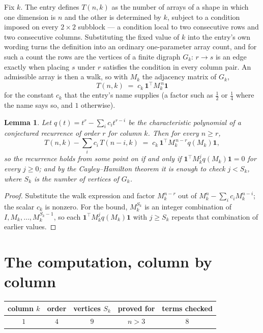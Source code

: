 \documentclass[11pt,a4paper]{article}
\theoremstyle{plain}
\newtheorem{lemma}[theorem]{Lemma}
\theoremstyle{definition}
\begin{document}
Fix $k$. The entry defines $T(n,k)$ as the number of arrays of a shape in which one dimension
is $n$ and the other is determined by $k$, subject to a condition imposed on every
$2\times2$ subblock --- a condition local to two consecutive rows and two consecutive columns.
Substituting the fixed value of $k$ into the entry's own wording turns the definition into an
ordinary one-parameter array count, and for such a count the rows are the vertices of a finite
digraph $G_k$: $r\to s$ is an edge exactly when placing $s$ under $r$ satisfies the condition
in every column pair. An admissible array is then a walk, so with $M_k$ the adjacency matrix
of $G_k$,
\[
T(n,k)\;=\;c_k\,\mathbf{1}^{\!\top}M_k^{\,n}\mathbf{1}
\]
for the constant $c_k$ that the entry's name supplies (a factor such as $\tfrac12$ or
$\tfrac14$ where the name says so, and $1$ otherwise).

\begin{lemma}\label{lem:crit}
Let $q(t)=t^{r}-\sum_i c_it^{r-i}$ be the characteristic polynomial of a conjectured
recurrence of order $r$ for column $k$. Then for every $n\ge r$,
\[
T(n,k)-\sum_i c_i\,T(n-i,k)\;=\;c_k\,\mathbf{1}^{\!\top}M_k^{\,n-r}q(M_k)\mathbf{1},
\]
so the recurrence holds from some point on if and only if
$\mathbf{1}^{\!\top}M_k^{j}q(M_k)\mathbf{1}=0$ for every $j\ge0$; and by the
Cayley--Hamilton theorem it is enough to check $j<S_k$, where $S_k$ is the number of vertices
of $G_k$.
\end{lemma}

\begin{proof}
Substitute the walk expression and factor $M_k^{n-r}$ out of $M_k^{n}-\sum_ic_iM_k^{n-i}$;
the scalar $c_k$ is nonzero. For the bound, $M_k^{S_k}$ is an integer combination of
$I,M_k,\dots,M_k^{S_k-1}$, so each $\mathbf{1}^{\!\top}M_k^{j}q(M_k)\mathbf{1}$ with
$j\ge S_k$ repeats that combination of earlier values.
\end{proof}

\section{The computation, column by column}

\begin{center}
\begin{tabular}{ccccc}
column $k$ & order & vertices $S_k$ & proved for & terms checked \\ \hline
$1$ & $4$ & $9$ & $n>3$ & $8$ \\
\end{tabular}
\end{center}
\end{document}
